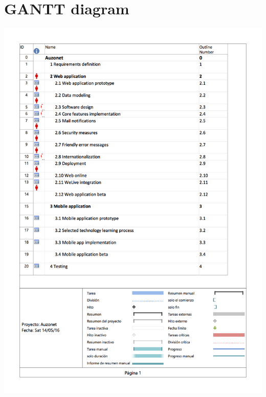 \documentclass{DeustoFDP}
\begin{document}
\newpage
\section{GANTT diagram}
\begin{center}
	\includegraphics[width=0.9\linewidth]{fig/g1}
\end{center}
\end{document}
